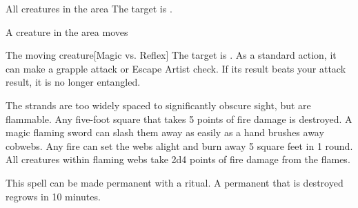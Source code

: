 \begin{spellheader}
    \spelldur{\durshort}
\end{spellheader}
\begin{spelleffects}
    \begin{spelltargets}{All creatures in the area}
        \spelleffect The target is \fatigued.
    \end{spelltargets}
\end{spelleffects}

\begin{spellheader}
    \spelldur{\durshort \dismissable}
\end{spellheader}
\begin{spelleffects}
    \begin{spelltrigger}{A creature in the area moves}
        \begin{spelltarget}{The moving creature}[Magic vs. Reflex]
            \spellsuccess The target is \entangled. As a standard action, it can make a grapple attack or Escape Artist check. If its result beats your attack result, it is no longer entangled.
        \end{spelltarget}
    \end{spelltrigger}
\end{spelleffects}
\begin{spellfooter}
    \spellnotes The strands are too widely spaced to significantly obscure sight, but are flammable. Any five-foot square that takes 5 points of fire damage is destroyed. A magic flaming sword can slash them away as easily as a hand brushes away cobwebs. Any fire can set the webs alight and burn away 5 square feet in 1 round. All creatures within flaming webs take 2d4 points of fire damage from the flames.

    This spell can be made permanent with a  ritual. A permanent  that is destroyed regrows in 10 minutes.
\end{spellfooter}

